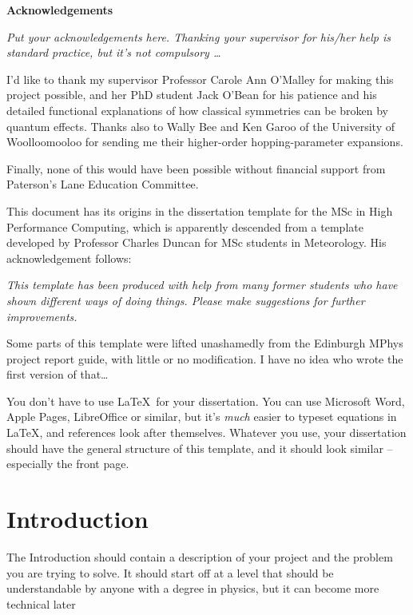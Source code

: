 \documentclass[12pt,a4paper]{report}
\begin{document}
\newpage

\begin{center}
\textbf{Acknowledgements}
\end{center}

\emph{Put your acknowledgements here. Thanking your supervisor for
his/her help is standard practice, but it's not compulsory \ldots}

I'd like to thank my supervisor Professor Carole Ann O'Malley for
making this project possible, and her PhD student Jack O'Bean for his
patience and his detailed functional explanations of how classical
symmetries can be broken by quantum effects. Thanks also to Wally Bee
and Ken Garoo of the University of Woolloomooloo for sending me
their higher-order hopping-parameter expansions.

Finally, none of this would have been possible without financial
support from Paterson's Lane Education Committee.

\bigskip

This document has its origins in the dissertation template for the MSc
in High Performance Computing, which is apparently descended from a
template developed by Professor Charles Duncan for MSc students in
Meteorology. His acknowledgement follows:

\emph{This template has been produced with help from many former
  students who have shown different ways of doing things. Please make
  suggestions for further improvements.}

Some parts of this template were lifted unashamedly from the Edinburgh
MPhys project report guide, with little or no modification. I have no
idea who wrote the first version of that\ldots

You don't have to use \LaTeX\ for your dissertation. You can use
Microsoft Word, Apple Pages, LibreOffice or similar, but it's
\emph{much} easier to typeset equations in \LaTeX, and references look
after themselves. Whatever you use, your dissertation should have the
general structure of this template, and it should look similar --
especially the front page.

\tableofcontents
\listoftables
\listoffigures


\chapter{Introduction}
The Introduction should contain a description of your project and the
problem you are trying to solve. It should start off at a level that
should be understandable by anyone with a degree in physics, but it
can become more technical later
\end{document}
